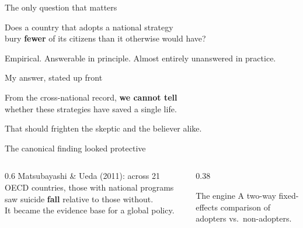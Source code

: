 \documentclass[aspectratio=169,11pt]{beamer}
\begin{document}
\begin{frame}{The only question that matters}
\vfill
\begin{center}
{\Large Does a country that adopts a national strategy}\\[0.5em]
{\Large bury \textbf{fewer} of its citizens than it otherwise would have?}
\end{center}
\vfill
\begin{center}\color{warmgray}Empirical. Answerable in principle. Almost entirely unanswered in practice.\end{center}
\vfill
\end{frame}

\begin{frame}{My answer, stated up front}
\vfill
\begin{center}
{\Large From the cross-national record, \textbf{we cannot tell}}\\[0.6em]
{\Large whether these strategies have saved a single life.}
\end{center}
\vfill
\begin{center}\color{tricrosso}\large That should frighten the skeptic and the believer alike.\end{center}
\vfill
\end{frame}


\begin{frame}{The canonical finding looked protective}
\begin{columns}[T]
\begin{column}{0.6\textwidth}
\vspace{1em}
Matsubayashi \& Ueda (2011): across 21 OECD countries, those with national programs saw suicide \textbf{fall} relative to those without.\\[1em]
It became the evidence base for a global policy.
\end{column}
\begin{column}{0.38\textwidth}
\vspace{1.2em}
\begin{block}{The engine}
A two-way fixed-effects comparison of adopters vs.\ non-adopters.
\end{block}
\end{column}
\end{columns}
\end{frame}
\end{document}

